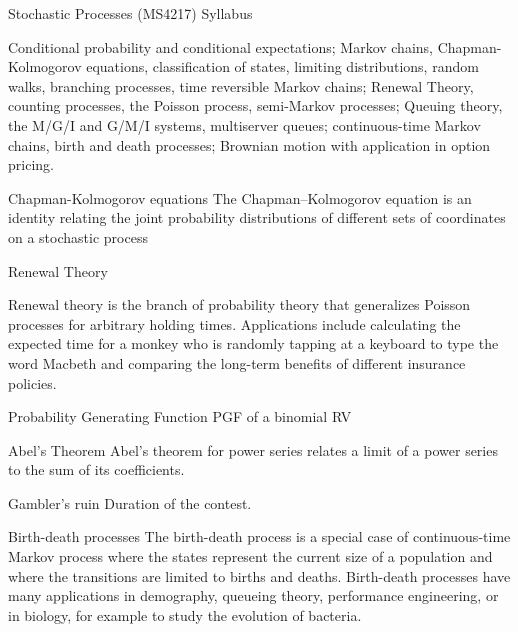 
Stochastic Processes (MS4217)
Syllabus

Conditional probability and conditional expectations; Markov chains, Chapman-Kolmogorov equations, classification of states, limiting distributions, random walks, branching processes, time reversible Markov chains; Renewal Theory, counting processes, the Poisson process, semi-Markov processes; Queuing theory, the M/G/I and G/M/I systems, multiserver queues; continuous-time Markov chains, birth and death processes; Brownian motion with application in option pricing.
 
Chapman-Kolmogorov equations
The Chapman–Kolmogorov equation is an identity relating the joint probability distributions of different sets of coordinates on a stochastic process
 
Renewal Theory
 
Renewal theory is the branch of probability theory that generalizes Poisson processes for arbitrary holding times. Applications include calculating the expected time for a monkey who is randomly tapping at a keyboard to type the word Macbeth and comparing the long-term benefits of different insurance policies.
 
 
Probability Generating Function
    PGF of a binomial RV
 
    Abel's Theorem
        Abel's theorem for power series relates a limit of a power series to the sum of its coefficients.
 
Gambler's ruin
    Duration of the contest.

Birth-death processes
The birth-death process is a special case of continuous-time Markov process where the states represent the current size of a population and where the transitions are limited to births and deaths.
Birth-death processes have many applications in demography, queueing theory, performance engineering, or in biology, for example to study the evolution of bacteria.
 
